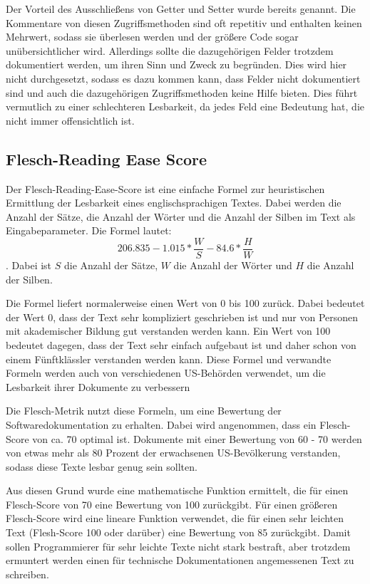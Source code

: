 Der Vorteil des Ausschließens von Getter und Setter wurde bereits genannt. Die Kommentare von diesen Zugriffsmethoden sind oft repetitiv und enthalten keinen Mehrwert, sodass sie überlesen werden und der größere Code sogar unübersichtlicher wird. Allerdings sollte die dazugehörigen Felder trotzdem dokumentiert werden, um ihren Sinn und Zweck zu begründen. Dies wird hier nicht durchgesetzt, sodass es dazu kommen kann, dass Felder nicht dokumentiert sind und auch die dazugehörigen Zugriffsmethoden keine Hilfe bieten. Dies führt vermutlich zu einer schlechteren Lesbarkeit, da jedes Feld eine Bedeutung hat, die nicht immer offensichtlich ist.
\subsection{Flesch-Reading Ease Score}\label{chapter:metrics_flesh}
Der Flesch-Reading-Ease-Score\cite[S. 21]{ThePrinciplesofReadability} ist eine einfache Formel zur heuristischen Ermittlung der Lesbarkeit eines englischsprachigen Textes. Dabei werden die Anzahl der Sätze, die Anzahl der Wörter und die Anzahl der Silben im Text als Eingabeparameter. Die Formel lautet:
\begin{equation}
   206.835-1.015*\frac{W}{S}-84.6*\frac{H}{W}
\end{equation}. Dabei ist $S$ die Anzahl der Sätze, $W$ die Anzahl der Wörter und $H$ die Anzahl der Silben. 

Die Formel liefert normalerweise einen Wert von 0 bis 100 zurück. Dabei bedeutet der Wert 0, dass der Text sehr kompliziert geschrieben ist und nur von Personen mit akademischer Bildung gut verstanden werden kann. Ein Wert von 100 bedeutet dagegen, dass der Text sehr einfach aufgebaut ist und daher schon von einem Fünftklässler verstanden werden kann. Diese Formel und verwandte Formeln werden auch von verschiedenen US-Behörden verwendet, um die Lesbarkeit ihrer Dokumente zu verbessern\cite[S. 72]{AutomaticQualityAssessmentofSourceCodeComments:TheJavadocMiner}

Die Flesch-Metrik nutzt diese Formeln, um eine Bewertung der Softwaredokumentation zu erhalten. Dabei wird angenommen, dass ein Flesch-Score von ca. 70 optimal ist. Dokumente mit einer Bewertung von 60 - 70 werden von etwas mehr als 80 Prozent der erwachsenen US-Bevölkerung verstanden, sodass diese Texte lesbar genug sein sollten.

Aus diesen Grund wurde eine mathematische Funktion ermittelt, die für einen Flesch-Score von 70 eine Bewertung von 100 zurückgibt. Für einen größeren Flesch-Score wird eine lineare Funktion verwendet, die für einen sehr leichten Text (Flesh-Score 100 oder darüber) eine Bewertung von 85 zurückgibt. Damit sollen Programmierer für sehr leichte Texte nicht stark bestraft, aber trotzdem ermuntert werden einen für technische Dokumentationen angemessenen Text zu schreiben.

